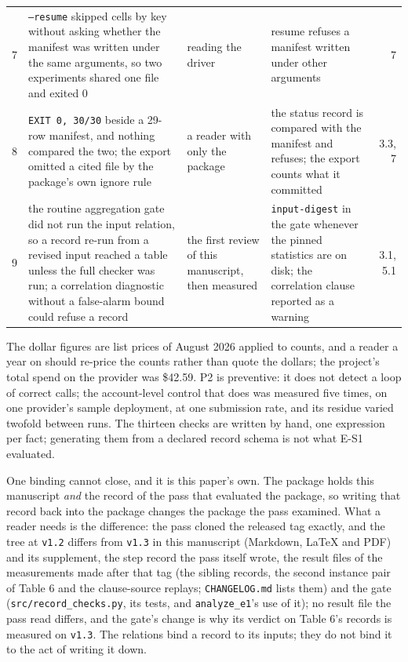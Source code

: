 \documentclass[acmsmall,screen,review]{acmart}
\begin{document}
\begin{xltabular}{\textwidth}{r>{\hsize}Y>{\hsize}Y>{\hsize}Yr}
7 & \texttt{--resume} skipped cells by key without asking whether the manifest was written under the same arguments, so two experiments shared one file and exited 0 & reading the driver & resume refuses a manifest written under other arguments & 7 \\
8 & \texttt{EXIT 0, 30/30} beside a 29-row manifest, and nothing compared the two; the export omitted a cited file by the package's own ignore rule & a reader with only the package & the status record is compared with the manifest and refuses; the export counts what it committed & 3.3, 7 \\
9 & the routine aggregation gate did not run the input relation, so a record re-run from a revised input reached a table unless the full checker was run; a correlation diagnostic without a false-alarm bound could refuse a record & the first review of this manuscript, then measured & \texttt{input-digest} in the gate whenever the pinned statistics are on disk; the correlation clause reported as a warning & 3.1, 5.1 \\
\end{xltabular}
\endgroup


The dollar figures are list prices of August 2026 applied to counts, and a reader a year on should re-price the counts rather than quote the dollars; the project's total spend on the provider was \$42.59. P2 is preventive: it does not detect a loop of correct calls; the account-level control that does was measured five times, on one provider's sample deployment, at one submission rate, and its residue varied twofold between runs. The thirteen checks are written by hand, one expression per fact; generating them from a declared record schema is not what E-S1 evaluated.


One binding cannot close, and it is this paper's own. The package holds this manuscript \textit{and} the record of the pass that evaluated the package, so writing that record back into the package changes the package the pass examined. What a reader needs is the difference: the pass cloned the released tag exactly, and the tree at \texttt{v1.2} differs from \texttt{v1.3} in this manuscript (Markdown, LaTeX and PDF) and its supplement, the step record the pass itself wrote, the result files of the measurements made after that tag (the sibling records, the second instance pair of Table 6 and the clause-source replays; \texttt{CHANGELOG.md} lists them) and the gate (\texttt{src/\allowbreak{}record\_\allowbreak{}checks.\allowbreak{}py}, its tests, and \texttt{analyze\_e1}'s use of it); no result file the pass read differs, and the gate's change is why its verdict on Table 6's records is measured on \texttt{v1.3}. The relations bind a record to its inputs; they do not bind it to the act of writing it down.
\end{document}

